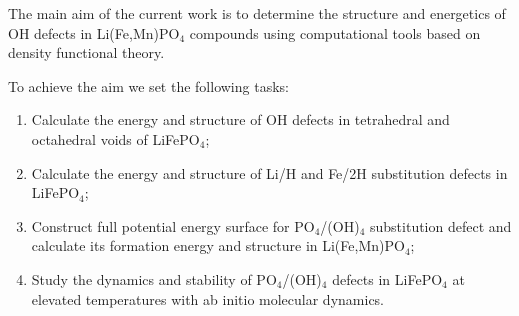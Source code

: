 The main aim of the current work is to determine the structure and energetics of OH defects in Li(Fe,Mn)PO$_4$ compounds using computational tools based on density functional theory.

To achieve the aim we set the following tasks:
\begin{enumerate} 
\item Calculate the energy and structure of OH defects in tetrahedral and octahedral voids of LiFePO$_4$;
\item Calculate the energy and structure of Li/H and Fe/2H substitution defects in LiFePO$_4$;
\item Construct full potential energy surface for PO$_4$/(OH)$_4$ substitution defect and calculate its formation energy and structure in Li(Fe,Mn)PO$_4$;
\item Study the dynamics and stability of PO$_4$/(OH)$_4$ defects in LiFePO$_4$ at elevated temperatures with ab initio molecular dynamics.
\end{enumerate}






